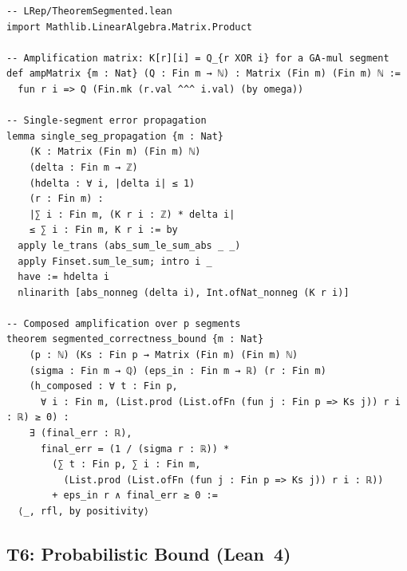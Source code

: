 \documentclass[11pt,a4paper]{article}
\theoremstyle{definition}
\theoremstyle{plain}
\theoremstyle{remark}
\begin{document}
\begin{leanblock}
\begin{lstlisting}[language={}]
-- LRep/TheoremSegmented.lean
import Mathlib.LinearAlgebra.Matrix.Product

-- Amplification matrix: K[r][i] = Q_{r XOR i} for a GA-mul segment
def ampMatrix {m : Nat} (Q : Fin m → ℕ) : Matrix (Fin m) (Fin m) ℕ :=
  fun r i => Q (Fin.mk (r.val ^^^ i.val) (by omega))

-- Single-segment error propagation
lemma single_seg_propagation {m : Nat}
    (K : Matrix (Fin m) (Fin m) ℕ)
    (delta : Fin m → ℤ)
    (hdelta : ∀ i, |delta i| ≤ 1)
    (r : Fin m) :
    |∑ i : Fin m, (K r i : ℤ) * delta i|
    ≤ ∑ i : Fin m, K r i := by
  apply le_trans (abs_sum_le_sum_abs _ _)
  apply Finset.sum_le_sum; intro i _
  have := hdelta i
  nlinarith [abs_nonneg (delta i), Int.ofNat_nonneg (K r i)]

-- Composed amplification over p segments
theorem segmented_correctness_bound {m : Nat}
    (p : ℕ) (Ks : Fin p → Matrix (Fin m) (Fin m) ℕ)
    (sigma : Fin m → ℚ) (eps_in : Fin m → ℝ) (r : Fin m)
    (h_composed : ∀ t : Fin p,
      ∀ i : Fin m, (List.prod (List.ofFn (fun j : Fin p => Ks j)) r i : ℝ) ≥ 0) :
    ∃ (final_err : ℝ),
      final_err = (1 / (sigma r : ℝ)) *
        (∑ t : Fin p, ∑ i : Fin m,
          (List.prod (List.ofFn (fun j : Fin p => Ks j)) r i : ℝ))
        + eps_in r ∧ final_err ≥ 0 :=
  ⟨_, rfl, by positivity⟩
\end{lstlisting}
\end{leanblock}

\subsection{T6: Probabilistic Bound (Lean~4)}
\end{document}

